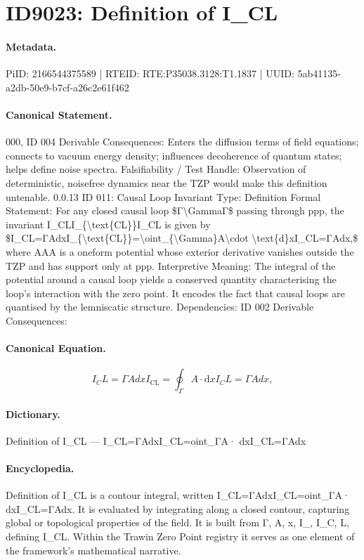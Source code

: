 \section*{ID9023: Definition of I\_CL}
\paragraph{Metadata.}
PiID: 2166544375589 | RTEID: RTE:P35038.3128:T1.1837 | UUID: 5ab41135-a2db-50e9-b7cf-a26c2e61f462

\paragraph{Canonical Statement.}
000, ID 004 Derivable Consequences: Enters the diffusion terms of field equations; connects to vacuum energy density; influences decoherence of quantum states; helps define noise spectra. Falsifiability / Test Handle: Observation of deterministic, noisefree dynamics near the TZP would make this definition untenable. 0.0.13 ID 011: Causal Loop Invariant Type: Definition Formal Statement: For any closed causal loop \$Γ\textbackslash{}GammaΓ\$ passing through ppp, the invariant I\_CLI\_\{\textbackslash{}text\{CL\}\}I\_CL is given by \$I\_CL=ΓAdxI\_\{\textbackslash{}text\{CL\}\}=\textbackslash{}oint\_\{\textbackslash{}Gamma\}A\textbackslash{}cdot \textbackslash{}text\{d\}xI\_CL=ΓAdx,\$ where AAA is a oneform potential whose exterior derivative vanishes outside the TZP and has support only at ppp. Interpretive Meaning: The integral of the potential around a causal loop yields a conserved quantity characterising the loop’s interaction with the zero point. It encodes the fact that causal loops are quantised by the lemniscatic structure. Dependencies: ID 002 Derivable Consequences:

\paragraph{Canonical Equation.}
\[
I_CL=ΓAdxI_{\text{CL}}=\oint_{\Gamma}A\cdot \text{d}xI_CL=ΓAdx,
\]

\paragraph{Dictionary.}
Definition of I\_CL — I\_CL=ΓAdxI\_CL=oint\_ΓA· dxI\_CL=ΓAdx

\paragraph{Encyclopedia.}
Definition of I\_CL is a contour integral, written I\_CL=ΓAdxI\_CL=oint\_ΓA· dxI\_CL=ΓAdx. It is evaluated by integrating along a closed contour, capturing global or topological properties of the field. It is built from Γ, A, x, I\_, I\_C, L, defining I\_CL. Within the Trawin Zero Point registry it serves as one element of the framework's mathematical narrative.
